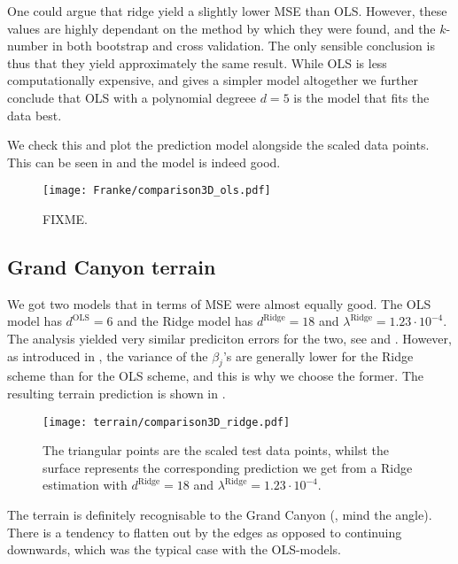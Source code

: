 One could argue that ridge yield a slightly lower MSE than OLS. However, these values are highly dependant on the method by which they were found, and the $k$-number in both bootstrap and cross validation. The only sensible conclusion is thus that they yield approximately the same result. While OLS is less computationally expensive, and gives a simpler model altogether we further conclude that OLS with a polynomial degreee $d=5$ is the model that fits the data best. 

We check this and plot the prediction model alongside the scaled data points. This can be seen in  and the model is indeed good. 

\begin{figure}
    \texttt{[image: Franke/comparison3D\_ols.pdf]}
    \caption{FIXME.}
    \label{fig:franke_final_model}
\end{figure}



\subsection{Grand Canyon terrain}

We got two models that in terms of MSE were almost equally good. The OLS model has $d^\text{OLS}=6$ and the Ridge model has $d^\text{Ridge}=18$ and $\lambda^\text{Ridge}=1.23\cdot10^{-4}$. The analysis yielded very similar prediciton errors for the two, see  and . However, as introduced in , the variance of the $\beta_j$'s are generally lower for the Ridge scheme than for the OLS scheme, and this is why we choose the former. The resulting terrain prediction is shown in .


\begin{figure}
    \texttt{[image: terrain/comparison3D\_ridge.pdf]}
    \caption{The triangular points are the scaled test data points, whilst the surface represents the corresponding prediction we get from a Ridge estimation with $d^\text{Ridge}=18$ and $\lambda^\text{Ridge}=1.23\cdot 10^{-4}$.}
    \label{fig:gc_final_model}
\end{figure}

The terrain is definitely recognisable to the Grand Canyon (, mind the angle). There is a tendency to flatten out by the edges as opposed to continuing downwards, which was the typical case with the OLS-models.
